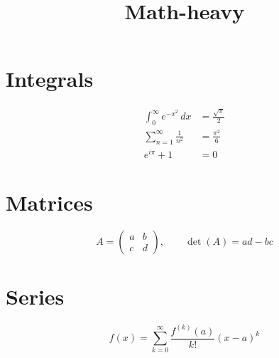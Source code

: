 \documentclass{article}
\title{Math-heavy}
\begin{document}
\maketitle
\section{Integrals}
\begin{align}
  \int_0^\infty e^{-x^2}\,dx &= \frac{\sqrt{\pi}}{2} \label{eq:gauss}\\
  \sum_{n=1}^{\infty} \frac{1}{n^2} &= \frac{\pi^2}{6} \label{eq:basel}\\
  e^{i\pi} + 1 &= 0 \label{eq:euler}
\end{align}
\section{Matrices}
\[
  A = \begin{pmatrix} a & b \\ c & d \end{pmatrix}, \qquad
  \det(A) = ad - bc
\]
\section{Series}
\[
  f(x) = \sum_{k=0}^{\infty} \frac{f^{(k)}(a)}{k!}(x-a)^k
\]
\end{document}
